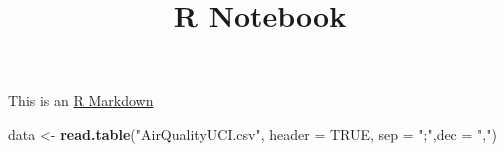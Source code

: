 \documentclass[
]{article}
\title{R Notebook}
\author{}
\date{\vspace{-2.5em}}
\newenvironment{Shaded}{\begin{snugshade}}{\end{snugshade}}
\newcommand{\AttributeTok}[1]{\textcolor[rgb]{0.13,0.29,0.53}{#1}}
\newcommand{\ConstantTok}[1]{\textcolor[rgb]{0.56,0.35,0.01}{#1}}
\newcommand{\FunctionTok}[1]{\textcolor[rgb]{0.13,0.29,0.53}{\textbf{#1}}}
\newcommand{\NormalTok}[1]{#1}
\newcommand{\OtherTok}[1]{\textcolor[rgb]{0.56,0.35,0.01}{#1}}
\newcommand{\StringTok}[1]{\textcolor[rgb]{0.31,0.60,0.02}{#1}}
\begin{document}
\maketitle

This is an \href{http://rmarkdown.rstudio.com}{R Markdown}

\begin{Shaded}
\begin{Highlighting}[]
\NormalTok{data }\OtherTok{\textless{}{-}} \FunctionTok{read.table}\NormalTok{(}\StringTok{"AirQualityUCI.csv"}\NormalTok{, }\AttributeTok{header =} \ConstantTok{TRUE}\NormalTok{, }\AttributeTok{sep =} \StringTok{";"}\NormalTok{,}\AttributeTok{dec =} \StringTok{","}\NormalTok{)}
\end{Highlighting}
\end{Shaded}
\end{document}
